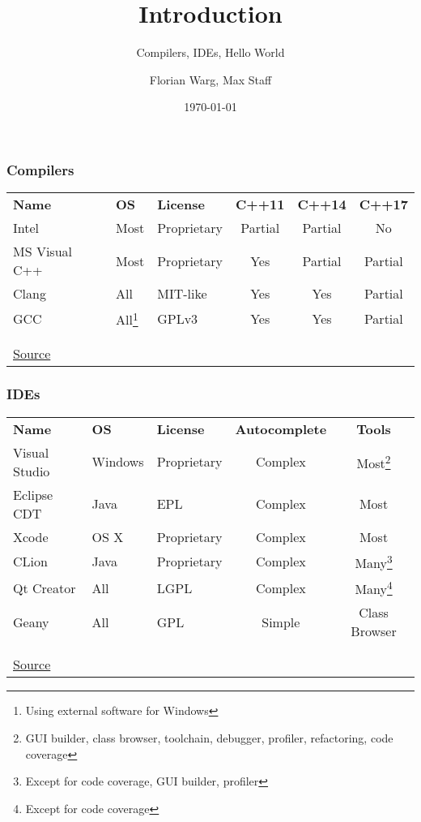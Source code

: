



\title{Introduction}
\subtitle{Compilers, IDEs, Hello World}
\date{\today}
\author{Florian Warg, Max Staff}

\maketitle

\begin{frame}[fragile]
    \frametitle{Compilers}
    \begin{tabular}{lllccc}
        \textbf{Name} & \textbf{OS} & \textbf{License} & \textbf{C++11} & \textbf{C++14} & \textbf{C++17} \\
        Intel & Most & Proprietary & Partial & Partial & No \\
        MS Visual C++ & Most & Proprietary & Yes & Partial & Partial \\
        Clang & All & MIT-like & Yes & Yes & Partial \\
        GCC & All\footnote{Using external software for Windows} & GPLv3 & Yes & Yes & Partial \\
    \\
    \\
    \href{https://en.wikipedia.org/wiki/List_of_compilers#C.2B.2B_compilers}{Source}
    \end{tabular} \bigskip
\end{frame}

\begin{frame}[fragile]
    \frametitle{IDEs}
    \begin{tabular}{lllcc}
        \textbf{Name} & \textbf{OS} & \textbf{License} & \textbf{Autocomplete} & \textbf{Tools} \\
        Visual Studio & Windows & Proprietary & Complex & Most\footnote{GUI builder, class browser, toolchain, debugger, profiler, refactoring, code coverage} \\
        Eclipse CDT & Java & EPL & Complex & Most\footnotemark[\value{footnote}] \\
        Xcode & OS X & Proprietary & Complex & Most\footnotemark[\value{footnote}] \\
        CLion & Java & Proprietary & Complex & Many\footnote{Except for code coverage, GUI builder, profiler} \\
        Qt Creator & All & LGPL & Complex & Many\footnote{Except for code coverage} \\
        Geany & All & GPL & Simple & \footnotesize{Class Browser} \\
    \\
    \\
    \href{https://en.wikipedia.org/wiki/Comparison_of_integrated_development_environments#C.2FC.2B.2B}{Source}
    \end{tabular} \bigskip
\end{frame}

